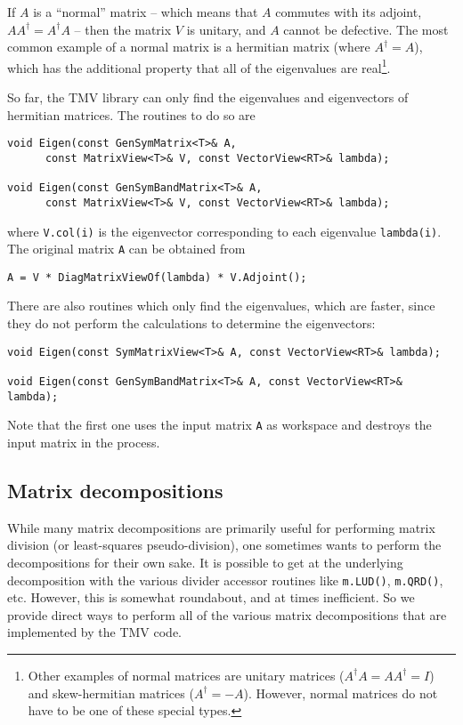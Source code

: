 \documentclass[twoside,letterpaper,11pt]{article}
\renewcommand{\tt}[1]{{\texttt {#1}}}
\begin{document}
If $A$ is a ``normal'' matrix -- which means that $A$ commutes with its adjoint,
$AA^\dagger = A^\dagger A$ -- then the 
matrix $V$ is unitary, and $A$ cannot be defective.  
The most common example of a normal matrix is a hermitian matrix
(where $A^\dagger = A$), which has
the additional property that all of the eigenvalues are real\footnote{
Other examples of normal matrices are unitary matrices ($A^\dagger A = AA^\dagger = I$)
and skew-hermitian matrices ($A^\dagger = -A$).  However, normal matrices do
not have to be one of these special types.}.

So far, the TMV library can only find the eigenvalues and eigenvectors 
of hermitian matrices.  The routines to do so are 
\begin{verbatim}
void Eigen(const GenSymMatrix<T>& A,
      const MatrixView<T>& V, const VectorView<RT>& lambda);

void Eigen(const GenSymBandMatrix<T>& A,
      const MatrixView<T>& V, const VectorView<RT>& lambda);
\end{verbatim}
where \tt{V.col(i)} is the eigenvector corresponding to each eigenvalue \tt{lambda(i)}.
The original matrix \tt{A} can be obtained from
\begin{verbatim}
A = V * DiagMatrixViewOf(lambda) * V.Adjoint();
\end{verbatim}

There are also routines which only find the eigenvalues, which are faster, since they
do not perform the calculations to determine the eigenvectors:
\begin{verbatim}
void Eigen(const SymMatrixView<T>& A, const VectorView<RT>& lambda);

void Eigen(const GenSymBandMatrix<T>& A, const VectorView<RT>& lambda);
\end{verbatim}
Note that the first one uses the input matrix \tt{A} as workspace and destroys the 
input matrix in the process.

\subsection{Matrix decompositions}
\label{Decompositions}

While many matrix decompositions are primarily useful for performing matrix division
(or least-squares pseudo-division), one sometimes wants to perform the decompositions for 
their own sake.  It is possible to get at the underlying decomposition with the various
divider accessor routines like \tt{m.LUD()}, \tt{m.QRD()}, etc.  However, this is somewhat
roundabout, and at times inefficient.  So we provide direct ways to perform all of
the various matrix decompositions that are implemented by the TMV code.
\end{document}
